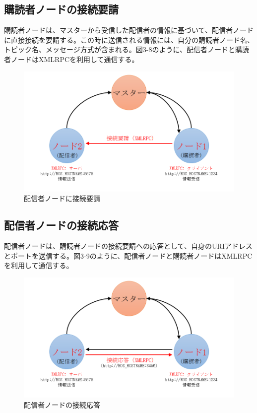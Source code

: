 \subsection{購読者ノードの接続要請}
購読者ノードは、マスターから受信した配信者の情報に基づいて、配信者ノードに直接接続を要請する。この時に送信される情報には、自分の購読者ノード名、トピック名、メッセージ方式が含まれる。図3-8のように、配信者ノードと購読者ノードはXMLRPCを利用して通信する。

\begin{figure}[h]
  \centering
  \includegraphics[width=12cm]{pictures/chapter3/pic_03_08.png}
  \caption{配信者ノードに接続要請}
\end{figure}

\subsection{配信者ノードの接続応答}
配信者ノードは、購読者ノードの接続要請への応答として、自身のURIアドレスとポートを送信する。図3-9のように、配信者ノードと購読者ノードはXMLRPCを利用して通信する。

\begin{figure}[h]
  \centering
  \includegraphics[width=12cm]{pictures/chapter3/pic_03_09.png}
  \caption{配信者ノードの接続応答}
\end{figure}

